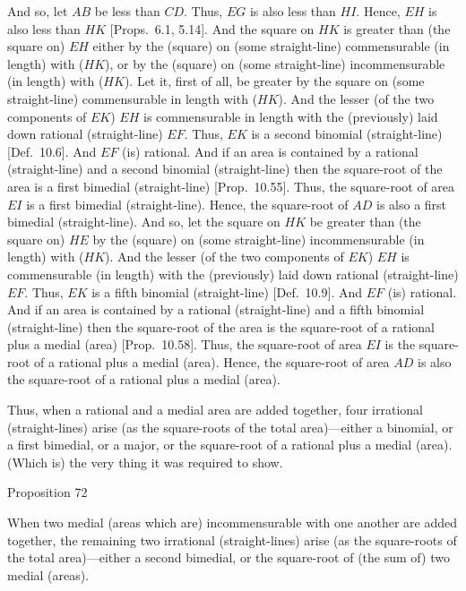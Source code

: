  And so, let $AB$ be less than $CD$. Thus, $EG$ is also less
 than $HI$. Hence, $EH$ is also less than $HK$ [Props.~6.1, 5.14].
 And the square on $HK$ is greater than (the square on) $EH$ either
 by the (square) on (some straight-line) commensurable (in length)
 with ($HK$), or by the (square) on (some straight-line) incommensurable
 (in length) with ($HK$). Let it, first of all, be greater by the square
 on (some straight-line) commensurable in length with ($HK$).
 And the lesser (of the two components of $EK$) $EH$ is  commensurable in length with the
 (previously) laid down rational (straight-line) $EF$. Thus, $EK$
 is a second binomial (straight-line) [Def.~10.6]. 
 And $EF$ (is) rational. And if an area is contained by a rational (straight-line)
 and a second binomial (straight-line)  then the square-root of the area is a
 first bimedial (straight-line) [Prop.~10.55]. 
 Thus, the square-root of area $EI$ is a first bimedial (straight-line).
 Hence, the square-root of $AD$ is also a first bimedial (straight-line).
 And so, let the square on $HK$ be greater than (the square on) $HE$
 by the (square) on (some straight-line) incommensurable (in length) with
 ($HK$). 
 And the lesser (of the two components of $EK$) $EH$ is commensurable (in length) with the (previously) laid down rational (straight-line) $EF$.  Thus, $EK$ is a fifth binomial
 (straight-line) [Def.~10.9]. And $EF$ (is) rational. And if an area is
 contained by a rational (straight-line) and a fifth binomial (straight-line) 
 then the square-root of the area is the square-root of a rational plus
 a medial (area) [Prop.~10.58]. Thus, the square-root of area $EI$ is the square-root of a rational plus a medial (area). Hence,
 the square-root of area $AD$ is also the square-root of a rational plus
 a medial (area).
 
 Thus, when a rational and a medial area are added together, four irrational
(straight-lines) arise (as the square-roots of the
total area)---either a binomial, or a first bimedial, or a major, or the
square-root of a rational plus a medial (area). (Which is) the very thing
it was required to show.


\begin{center}
{\large Proposition 72}
\end{center}

When two medial (areas which are) incommensurable with one another are added together, the remaining
two irrational (straight-lines) arise (as the square-roots of the total area)---either a second bimedial, or the square-root of (the sum of)
two medial (areas).

